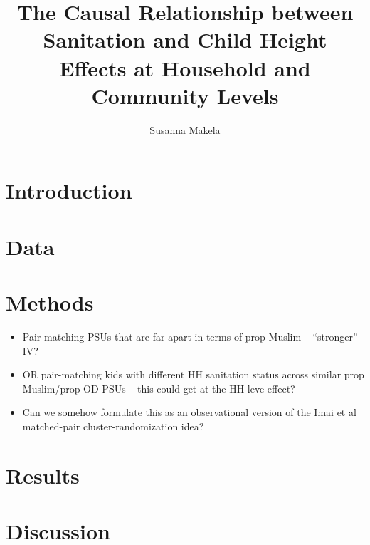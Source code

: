 \documentclass[10pt,a4paper]{article}
\author{Susanna Makela}
\title{The Causal Relationship between Sanitation and Child Height \\
		\Large Effects at Household and Community Levels}
\begin{document}
\maketitle

\section*{Introduction}


\section*{Data}

\section*{Methods}
\begin{itemize}
	\item Pair matching PSUs that are far apart in terms of prop Muslim -- ``stronger'' IV?
	\item OR pair-matching kids with different HH sanitation status across similar prop Muslim/prop OD PSUs -- this could get at the HH-leve effect?
	\item Can we somehow formulate this as an observational version of the Imai et al matched-pair cluster-randomization idea?
\end{itemize}

\section*{Results}

\section*{Discussion}


\end{document}
